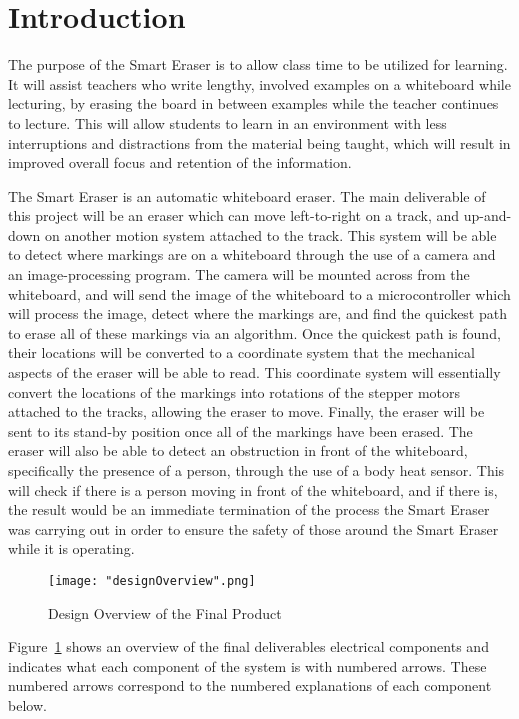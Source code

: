  \section{Introduction}
 The purpose of the Smart Eraser is to allow class time to be utilized for learning. It will assist teachers who write lengthy, involved examples on a whiteboard while lecturing, by erasing the board in between examples while the teacher continues to lecture. This will allow students to learn in an environment with less interruptions and distractions from the material being taught, which will result in improved overall focus and retention of the information.  
 \par
\setlength{\parindent}{2.5ex}The Smart Eraser is an automatic whiteboard eraser. The main deliverable of  this project will be an eraser which can move left-to-right on a track, and up-and-down on another motion system attached to the track. This system will be able to detect where markings are on a whiteboard through the use of a camera and an image-processing program. The camera will be mounted across from the whiteboard, and will send the image of the whiteboard to a microcontroller which will process the image, detect where the markings are, and find the quickest path to erase all of these markings via an algorithm. Once the quickest path is found, their locations will be converted to a coordinate system that the mechanical aspects of the eraser will be able to read. This coordinate system will essentially convert the locations of the markings into rotations of the stepper motors attached to the tracks, allowing the eraser to move. Finally, the eraser will be sent to its stand-by position once all of the markings have been erased. The eraser will also be able to detect an obstruction in front of the whiteboard, specifically the presence of a person, through the use of a body heat sensor. This will check if there is a person moving in front of the whiteboard, and if there is, the result would be an immediate termination of the process the Smart Eraser was carrying out in order to ensure the safety of those around the Smart Eraser while it is operating.
 \par

\begin{figure}[H]
	\centering
	{\texttt{[image: "designOverview".png]}}
	\caption{Design Overview of the Final Product\cite{cam} }
	\label{fig:rough}
\end{figure}

Figure~\ref{fig:rough} shows an overview of the final deliverables electrical components and indicates what each component of the system is with numbered arrows. These numbered arrows correspond to the numbered explanations of each component below.

